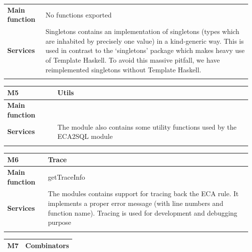 \documentclass[12pt]{article}
\begin{document}
{{{{\begin{tabularx}{\textwidth}{>{\bfseries}m{4cm}X}
        Main function  &  No functions exported
        \\	Services &  Singletons contains an implementation of singletons (types which are inhabited by precisely one value)
  in a kind-generic way. This is used in contrast to the `singletons' package which makes heavy use of 
  Template Haskell. To avoid this massive pitfall, we have reimplemented singletons without Template Haskell.
        \\       
        \vspace{12pt}
    \end{tabularx}\vspace{3em}
{\setlength{\tabcolsep}{6pt} 
    \begin{tabularx}{\textwidth}{>{\bfseries}m{4cm}X}
        M5 & Utils \\ 
        \midrule
        
        Main function  & 
        \\	Services &  The module also contains some utility functions used by the ECA2SQL module
        \\       
        \vspace{12pt}
    \end{tabularx}\vspace{3em}
{\setlength{\tabcolsep}{6pt} 
    \begin{tabularx}{\textwidth}{>{\bfseries}m{4cm}X}
        M6 & Trace \\ 
        \midrule
        
        Main function  &  getTraceInfo 
        \\	Services &  The modules contains support for tracing back the ECA rule. It implements a proper error message (with line numbers and function name). Tracing is used for development and debugging purpose
        \\       
        \vspace{12pt}
    \end{tabularx}\vspace{3em}
{\setlength{\tabcolsep}{6pt} 
    \begin{tabularx}{\textwidth}{>{\bfseries}m{5cm}X}
        M7 & Combinators \\ 
        \midrule
        

\end{tabularx}}}}}}}}
\end{document}
